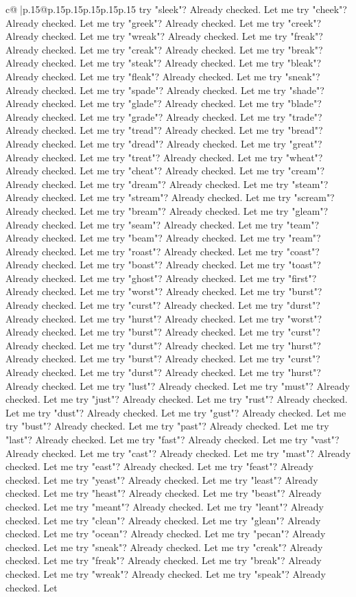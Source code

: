 \documentclass{article}
\begin{document}
{\begin{supertabular}{c@{$\;$}|p{.15\linewidth}@{}p{.15\linewidth}p{.15\linewidth}p{.15\linewidth}p{.15\linewidth}p{.15\linewidth}}
{{{try "sleek"? Already checked. Let me try "cheek"? Already checked. Let me try "greek"? Already checked. Let me try "creek"? Already checked. Let me try "wreak"? Already checked. Let me try "freak"? Already checked. Let me try "creak"? Already checked. Let me try "break"? Already checked. Let me try "steak"? Already checked. Let me try "bleak"? Already checked. Let me try "fleak"? Already checked. Let me try "sneak"? Already checked. Let me try "spade"? Already checked. Let me try "shade"? Already checked. Let me try "glade"? Already checked. Let me try "blade"? Already checked. Let me try "grade"? Already checked. Let me try "trade"? Already checked. Let me try "tread"? Already checked. Let me try "bread"? Already checked. Let me try "dread"? Already checked. Let me try "great"? Already checked. Let me try "treat"? Already checked. Let me try "wheat"? Already checked. Let me try "cheat"? Already checked. Let me try "cream"? Already checked. Let me try "dream"? Already checked. Let me try "steam"? Already checked. Let me try "stream"? Already checked. Let me try "scream"? Already checked. Let me try "bream"? Already checked. Let me try "gleam"? Already checked. Let me try "seam"? Already checked. Let me try "team"? Already checked. Let me try "beam"? Already checked. Let me try "ream"? Already checked. Let me try "roast"? Already checked. Let me try "coast"? Already checked. Let me try "boast"? Already checked. Let me try "toast"? Already checked. Let me try "ghost"? Already checked. Let me try "first"? Already checked. Let me try "worst"? Already checked. Let me try "burst"? Already checked. Let me try "curst"? Already checked. Let me try "durst"? Already checked. Let me try "hurst"? Already checked. Let me try "worst"? Already checked. Let me try "burst"? Already checked. Let me try "curst"? Already checked. Let me try "durst"? Already checked. Let me try "hurst"? Already checked. Let me try "burst"? Already checked. Let me try "curst"? Already checked. Let me try "durst"? Already checked. Let me try "hurst"? Already checked. Let me try "lust"? Already checked. Let me try "must"? Already checked. Let me try "just"? Already checked. Let me try "rust"? Already checked. Let me try "dust"? Already checked. Let me try "gust"? Already checked. Let me try "bust"? Already checked. Let me try "past"? Already checked. Let me try "last"? Already checked. Let me try "fast"? Already checked. Let me try "vast"? Already checked. Let me try "cast"? Already checked. Let me try "mast"? Already checked. Let me try "east"? Already checked. Let me try "feast"? Already checked. Let me try "yeast"? Already checked. Let me try "least"? Already checked. Let me try "heast"? Already checked. Let me try "beast"? Already checked. Let me try "meant"? Already checked. Let me try "leant"? Already checked. Let me try "clean"? Already checked. Let me try "glean"? Already checked. Let me try "ocean"? Already checked. Let me try "pecan"? Already checked. Let me try "sneak"? Already checked. Let me try "creak"? Already checked. Let me try "freak"? Already checked. Let me try "break"? Already checked. Let me try "wreak"? Already checked. Let me try "speak"? Already checked. Let }}}
\end{supertabular}}
\end{document}
